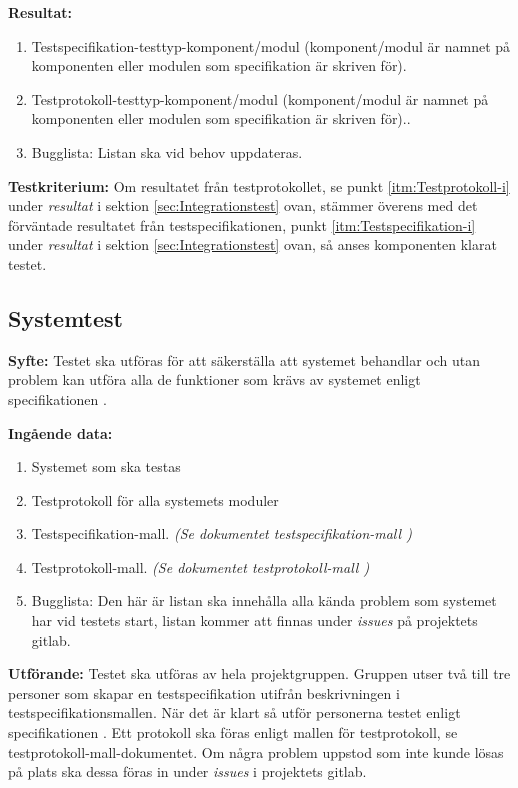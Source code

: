 \documentclass[a4paper,10pt]{article}
\begin{document}
\textbf{Resultat:}
    \begin{enumerate}
        \item \label{itm:Testspecifikation-i}
        Testspecifikation-testtyp-komponent/modul (komponent/modul är namnet på
        komponenten eller modulen som specifikation är skriven för).
        \item \label{itm:Testprotokoll-i} Testprotokoll-testtyp-komponent/modul
        (komponent/modul är namnet på komponenten eller modulen som
        specifikation är skriven för)..
        \item Bugglista: Listan ska vid behov uppdateras.
    \end{enumerate}

\textbf{Testkriterium:} Om resultatet från testprotokollet, se punkt \ref{itm:Testprotokoll-i} under \emph{resultat} i sektion
\ref{sec:Integrationstest} ovan, stämmer överens med det förväntade resultatet
från testspecifikationen, punkt \ref{itm:Testspecifikation-i} under
\emph{resultat} i sektion \ref{sec:Integrationstest} ovan, så anses komponenten
klarat testet.

\subsection{Systemtest}
\label{sec:Systemtest}
\textbf{Syfte:}
Testet ska utföras för att säkerställa att systemet behandlar och utan problem
kan utföra alla de funktioner som krävs av systemet enligt specifikationen
\cite{kravspec}.

\textbf{Ingående data:}
   \begin{enumerate}
       \item Systemet som ska testas
       \item Testprotokoll för alla systemets moduler
       \item Testspecifikation-mall.
       \emph{(Se dokumentet testspecifikation-mall \cite{testspec-mall})}
       \item Testprotokoll-mall.
       \emph{(Se dokumentet testprotokoll-mall \cite{testprot-mall})}
       \item Bugglista: Den här är listan ska innehålla alla kända problem som
       systemet har vid testets start, listan kommer att finnas under
       \emph{issues} på projektets gitlab.
   \end{enumerate}

\textbf{Utförande:} Testet ska utföras av hela projektgruppen. Gruppen utser två
till tre personer som skapar en testspecifikation utifrån beskrivningen i
testspecifikationsmallen. När det är klart så utför personerna testet enligt
specifikationen \cite{kravspec}. Ett protokoll ska föras enligt mallen för
testprotokoll, se testprotokoll-mall-dokumentet. Om några problem uppstod som
inte kunde lösas på plats ska dessa föras in under \emph{issues} i projektets
gitlab.
\end{document}
